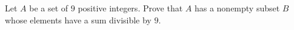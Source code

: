 Let $A$ be a set of $9$ positive integers. Prove that $A$ has a nonempty subset $B$ whose elements have a sum divisible by $9$.
